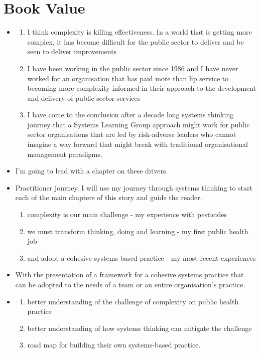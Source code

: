 \section*{Book Value}
\begin{itemize}
	\item {} 
	\begin{enumerate}
		\item I think complexity is killing effectiveness. In a world that is getting more complex, it has become difficult for the public sector to deliver and be seen to deliver improvements
		\item I have been working in the public sector since 1986 and I have never worked for an organisation that has paid more than lip service to becoming more complexity-informed in their approach to the development and delivery of public sector services
		\item I have come to the conclusion after a decade long systems thinking journey that a Systems Learning Group approach might work for public sector organisations that are led by risk-adverse leaders who cannot imagine a way forward that might break with traditional organisational management paradigms. 
	\end{enumerate}
	\item {} I'm going to lead with a chapter on these drivers.
	\item {} Practitioner journey. I will use my journey through systems thinking to start each of the main chapters of this story and guide the reader.
	\begin{enumerate}
		\item complexity is our main challenge - my experience with pesticides
		\item we must transform thinking, doing and learning - my first public health job
		\item and adopt a cohesive systems-based practice - my most recent experiences
	\end{enumerate}
	
	\item {} With the presentation of a framework for a cohesive systems practice that can be adopted to the needs of a team or an entire organisation's practice.
	\item {}   
		\begin{enumerate}
		\item better understanding of the challenge of complexity on public health practice
		\item better understanding of how systems thinking can mitigate the challenge
		\item road map for building their own systems-based practice.
	\end{enumerate}
\end{itemize}

